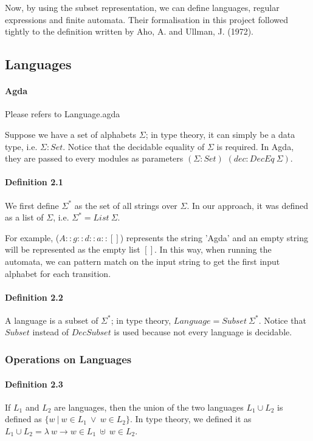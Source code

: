 \documentclass[twoside,openright,final]{bhamthesis}
\begin{document}
\par Now, by using the subset representation, we can define languages, regular expressions and finite
automata. Their formalisation in this project followed tightly to the
definition written by Aho, A. and Ullman, J. (1972). 

\subsection{Languages}
\paragraph{Agda} Please refers to Language.agda \\

\par Suppose we have a set of alphabets \(\Sigma\); in type theory, it
can simply be a data type, i.e. \(\Sigma : Set\). Notice that the decidable equality of
\(\Sigma\) is required. In Agda, they are passed to every modules as
parameters \((\Sigma : Set)\) \((dec : DecEq\ \Sigma)\).

\paragraph{Definition 2.1} We first define \(\Sigma^*\) as the set of all
strings over \(\Sigma\). In our approach, it was defined as a list of
\(\Sigma\), i.e. \(\Sigma^* = List\ \Sigma\). \\

\par For example, (\(A :: g ::
d :: a :: []\)) represents the string 'Agda' and an empty string will
be represented as the empty list \([]\). In this way, when running the
automata, we can pattern match on the input string to get the first
input alphabet for each transition. 

\paragraph{Definition 2.2} A language is a subset of
\(\Sigma^*\); in type theory, \(Language = Subset\ \Sigma^*\). 
Notice that \(Subset\) instead of \(DecSubset\) is used because not every language is decidable. 

\subsubsection{Operations on Languages}

\paragraph{Definition 2.3} If \(L_1\) and \(L_2\) are languages, then
the union of the two languages \(L_1\cup L_2\) is defined as \(\{w\
|\  w \in L_1\ \vee \ w \in
L_2\}\). In type theory, we defined it as \(L_1 \cup L_2 = \lambda\ w \to w \in L_1\ \uplus\ w
\in L_2\).
\end{document}
